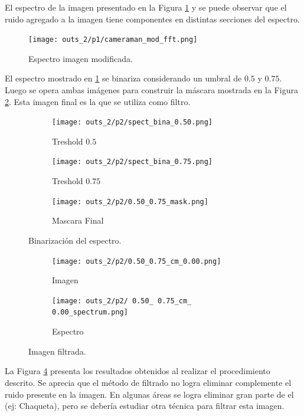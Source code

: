 \documentclass[
  letterpaper,
  twocolumn,
  9pt,
  journal,
  final]{IEEEtran}
\begin{document}
El espectro de la imagen presentado en la Figura \ref{camaraman_fft} y se puede observar que el ruido agregado a la imagen tiene componentes en distintas secciones del espectro.

\begin{figure}[!tbh]
	\texttt{[image: outs\_2/p1/cameraman\_mod\_fft.png]}
	\caption{Espectro imagen modificada.} \label{camaraman_fft}
\end{figure}

El espectro mostrado en \ref{camaraman_fft} se binariza considerando un umbral de $0.5$ y $0.75$. Luego se opera ambas imágenes para construir la máscara mostrada en la Figura \ref{mi_filtro}. Esta imagen final es la que se utiliza como filtro.

\begin{figure}[!tbh]
	\centering
  \begin{subfigure}[b]{.3\linewidth}
		\texttt{[image: outs\_2/p2/spect\_bina\_0.50.png]}
		\caption{Treshold $0.5$}
	\end{subfigure}
  \begin{subfigure}[b]{.3\linewidth}
    \texttt{[image: outs\_2/p2/spect\_bina\_0.75.png]}
		\caption{Treshold $0.75$}
	\end{subfigure}
  \begin{subfigure}[b]{.3\linewidth}
    \texttt{[image: outs\_2/p2/0.50\_0.75\_mask.png]}
		\caption{Mascara Final} \label{mi_filtro}
	\end{subfigure}
  \caption{Binarización del espectro.} \label{bin_spectrum}
\end{figure}



\begin{figure}[!tbh]
	\centering
  \begin{subfigure}[b]{.49\linewidth}
		\texttt{[image: outs\_2/p2/0.50\_0.75\_cm\_0.00.png]}
		\caption{Imagen}
	\end{subfigure}
  \begin{subfigure}[b]{.49\linewidth}
    \texttt{[image: outs\_2/p2/ 0.50\_ 0.75\_cm\_ 0.00\_spectrum.png]}
		\caption{Espectro}
	\end{subfigure}
  \caption{Imagen filtrada.} \label{camera_filtered}
\end{figure}

La Figura \ref{camera_filtered} presenta los resultados obtenidos al realizar el procedimiento descrito. Se aprecia que el método de filtrado no logra eliminar complemente el ruido presente en la imagen. En algunas áreas se logra eliminar gran parte de el (ej: Chaqueta), pero se debería estudiar otra técnica para filtrar esta imagen.
\end{document}
